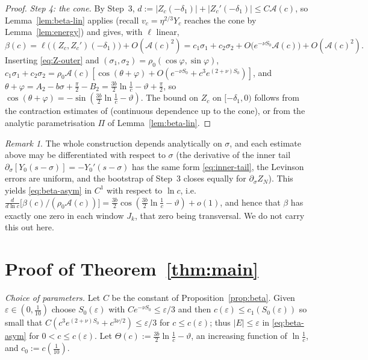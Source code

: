 \documentclass[11pt,a4paper]{amsart}
\theoremstyle{definition}
\theoremstyle{remark}
\newtheorem{remark}[theorem]{Remark}
\newcommand{\eps}{\varepsilon}
\begin{document}
\begin{proof}
\emph{Step 4: the cone.}  By Step~3, $d:=|Z_c(-\delta_1)|+|Z_c'(-\delta_1)|\le C\mathcal A(c)$, so Lemma~\ref{lem:beta-lin} applies (recall $v_c=\eta^{2/3}Y_c$ reaches the cone by Lemma~\ref{lem:energy}) and gives, with $\ell$ linear,
\[
\beta(c)=\ell\big((Z_c,Z_c')(-\delta_1)\big)+O(\mathcal A(c)^2)
=c_1\sigma_1+c_2\sigma_2+O\big(e^{-\nu S_0}\mathcal A(c)\big)+O(\mathcal A(c)^2).
\]
Inserting \eqref{eq:Z-outer} and $(\sigma_1,\sigma_2)=\rho_0(\cos\varphi,\sin\varphi)$,
$c_1\sigma_1+c_2\sigma_2=\rho_0\mathcal A(c)[\cos(\theta+\varphi)+O(e^{-\nu S_0}+c^3e^{(2+\nu)S_0})]$, and
$\theta+\varphi=A_2-b\sigma+\frac\pi2-B_2=\frac{3b}2\ln\frac1c-\vartheta+\frac\pi2$, so $\cos(\theta+\varphi)=-\sin(\frac{3b}2\ln\frac1c-\vartheta)$.  The bound on $Z_c$ on $[-\delta_1,0)$ follows from the contraction estimates of \cite[Lemma A.2]{GHL22} (continuous dependence up to the cone), or from the analytic parametrisation $\Pi$ of Lemma~\ref{lem:beta-lin}.
\end{proof}

\begin{remark}\label{rem:transversal}
The whole construction depends analytically on $\sigma$, and each estimate above may be differentiated with respect to $\sigma$ (the derivative of the inner tail $\partial_\sigma[Y_0(s-\sigma)]=-Y_0'(s-\sigma)$ has the same form \eqref{eq:inner-tail}, the Levinson errors are uniform, and the bootstrap of Step~3 closes equally for $\partial_\sigma Z_N$).  This yields \eqref{eq:beta-asym} in $C^1$ with respect to $\ln c$, i.e.\ $\frac{d}{d\ln c}\big[\beta(c)/(\rho_0\mathcal A(c))\big]=\frac{3b}{2}\cos(\frac{3b}2\ln\frac1c-\vartheta)+o(1)$, and hence that $\beta$ has exactly one zero in each window $J_k$, that zero being transversal.  We do not carry this out here.
\end{remark}

\section{Proof of Theorem~\ref{thm:main}}\label{sec:proof}

\emph{Choice of parameters.}  Let $C$ be the constant of Proposition~\ref{prop:beta}.  Given $\eps\in(0,\frac1{10})$ choose $S_0(\eps)$ with $Ce^{-\nu S_0}\le\eps/3$ and then $c(\eps)\le c_1(S_0(\eps))$ so small that $C(c^3e^{(2+\nu)S_0}+c^{3\nu/2})\le\eps/3$ for $c\le c(\eps)$; thus $|E|\le\eps$ in \eqref{eq:beta-asym} for $0<c\le c(\eps)$.  Let $\Theta(c):=\frac{3b}2\ln\frac1c-\vartheta$, an increasing function of $\ln\frac1c$, and $c_0:=c(\frac1{10})$.
\end{document}
